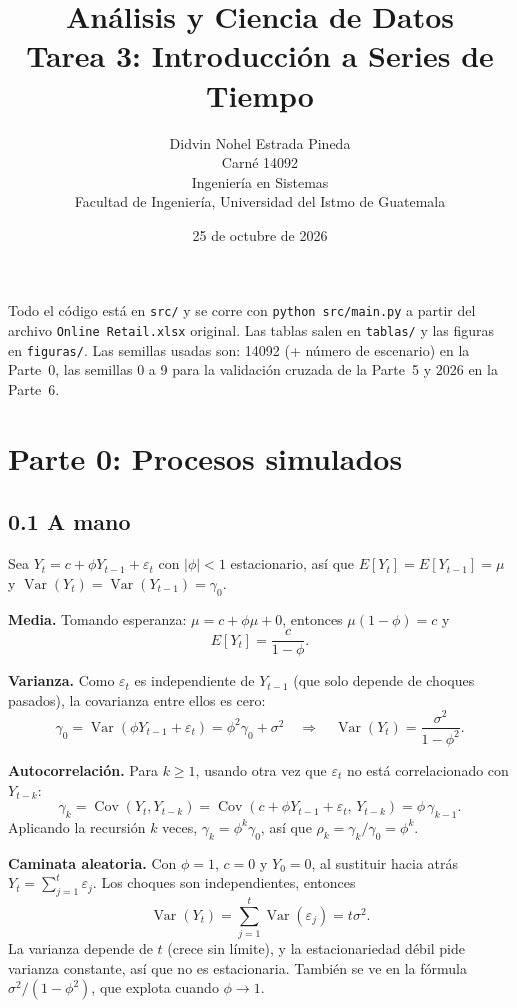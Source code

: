\documentclass[11pt]{article}
\title{Análisis y Ciencia de Datos\\Tarea 3: Introducción a Series de Tiempo}
\author{Didvin Nohel Estrada Pineda \\ Carné 14092 \\ Ingeniería en Sistemas \\ Facultad de Ingeniería, Universidad del Istmo de Guatemala}
\date{25 de octubre de 2026}
\begin{document}
\maketitle

\noindent Todo el código está en \texttt{src/} y se corre con \texttt{python src/main.py} a partir del archivo \texttt{Online Retail.xlsx} original. Las tablas salen en \texttt{tablas/} y las figuras en \texttt{figuras/}. Las semillas usadas son: 14092 (+ número de escenario) en la Parte~0, las semillas 0 a 9 para la validación cruzada de la Parte~5 y 2026 en la Parte~6.

\section{Parte 0: Procesos simulados}

\subsection*{0.1 A mano}
Sea $Y_t = c + \phi Y_{t-1} + \varepsilon_t$ con $|\phi|<1$ estacionario, así que $E[Y_t]=E[Y_{t-1}]=\mu$ y $\operatorname{Var}(Y_t)=\operatorname{Var}(Y_{t-1})=\gamma_0$.

\textbf{Media.} Tomando esperanza: $\mu = c + \phi\mu + 0$, entonces $\mu(1-\phi)=c$ y
\[ E[Y_t] = \frac{c}{1-\phi}. \]

\textbf{Varianza.} Como $\varepsilon_t$ es independiente de $Y_{t-1}$ (que solo depende de choques pasados), la covarianza entre ellos es cero:
\[ \gamma_0 = \operatorname{Var}(\phi Y_{t-1} + \varepsilon_t) = \phi^2\gamma_0 + \sigma^2 \quad\Rightarrow\quad \operatorname{Var}(Y_t)=\frac{\sigma^2}{1-\phi^2}. \]

\textbf{Autocorrelación.} Para $k\ge 1$, usando otra vez que $\varepsilon_t$ no está correlacionado con $Y_{t-k}$:
\[ \gamma_k = \operatorname{Cov}(Y_t, Y_{t-k}) = \operatorname{Cov}(c+\phi Y_{t-1}+\varepsilon_t,\, Y_{t-k}) = \phi\,\gamma_{k-1}. \]
Aplicando la recursión $k$ veces, $\gamma_k = \phi^k\gamma_0$, así que $\rho_k=\gamma_k/\gamma_0=\phi^k$.

\textbf{Caminata aleatoria.} Con $\phi=1$, $c=0$ y $Y_0=0$, al sustituir hacia atrás $Y_t = \sum_{j=1}^{t}\varepsilon_j$. Los choques son independientes, entonces
\[ \operatorname{Var}(Y_t)=\sum_{j=1}^{t}\operatorname{Var}(\varepsilon_j)=t\sigma^2. \]
La varianza depende de $t$ (crece sin límite), y la estacionariedad débil pide varianza constante, así que no es estacionaria. También se ve en la fórmula $\sigma^2/(1-\phi^2)$, que explota cuando $\phi\to1$.
\end{document}
